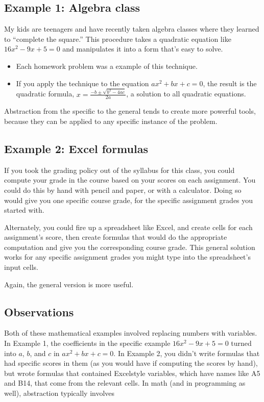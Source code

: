 \documentclass[letterpaper,10pt,english]{sphinxmanual}
\begin{document}
\subsection{Example 1: Algebra class}
\label{\detokenize{chapter-7-abstraction:example-1-algebra-class}}
My kids are teenagers and have recently taken algebra classes where they learned to “complete the square.”  This procedure takes a quadratic equation like \(16x^2-9x+5=0\) and manipulates it into a form that’s easy to solve.
\begin{itemize}
\item {} 
Each homework problem was a  example of this technique.

\item {} 
If you apply the technique to the equation \(ax^2+bx+c=0\), the result is the quadratic formula, \(x=\frac{-b\pm\sqrt{b^2-4ac}}{2a}\), a  solution to all quadratic equations.

\end{itemize}

Abstraction from the specific to the general tends to create more powerful tools, because they can be applied to any specific instance of the problem.


\subsection{Example 2: Excel formulas}
\label{\detokenize{chapter-7-abstraction:example-2-excel-formulas}}
If you took the grading policy out of the syllabus for this class, you could compute your grade in the course based on your scores on each assignment.  You could do this by hand with pencil and paper, or with a calculator.  Doing so would give you one specific course grade, for the specific assignment grades you started with.

Alternately, you could fire up a spreadsheet like Excel, and create cells for each assignment’s score, then create formulas that would do the appropriate computation and give you the corresponding course grade.  This general solution works for any specific assignment grades you might type into the spreadsheet’s input cells.

Again, the general version is more useful.


\subsection{Observations}
\label{\detokenize{chapter-7-abstraction:observations}}
Both of these mathematical examples involved replacing numbers with variables.  In Example 1, the coefficients in the specific example \(16x^2-9x+5=0\) turned into \(a\), \(b\), and \(c\) in \(ax^2+bx+c=0\).  In Example 2, you didn’t write formulas that had specific scores in them (as you would have if computing the scores by hand), but wrote formulas that contained Excel\sphinxhyphen{}style variables, which have names like A5 and B14, that come from the relevant cells.  In math (and in programming as well), abstraction typically involves 
\end{document}
